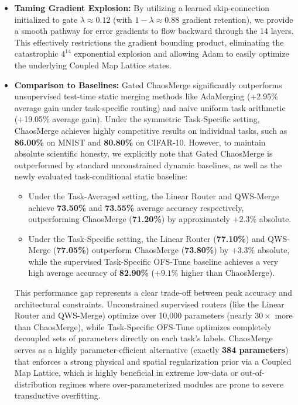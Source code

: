\begin{itemize}
    \item \textbf{Taming Gradient Explosion:} By utilizing a learned skip-connection initialized to gate $\lambda \approx 0.12$ (with $1-\lambda \approx 0.88$ gradient retention), we provide a smooth pathway for error gradients to flow backward through the 14 layers. This effectively restrictions the gradient bounding product, eliminating the catastrophic $4^{14}$ exponential explosion and allowing Adam to easily optimize the underlying Coupled Map Lattice states.
    \item \textbf{Comparison to Baselines:} Gated ChaosMerge significantly outperforms unsupervised test-time static merging methods like AdaMerging (+2.95\% average gain under task-specific routing) and naive uniform task arithmetic (+19.05\% average gain). Under the symmetric Task-Specific setting, ChaosMerge achieves highly competitive results on individual tasks, such as \textbf{86.00\%} on MNIST and \textbf{80.80\%} on CIFAR-10. 
    However, to maintain absolute scientific honesty, we explicitly note that Gated ChaosMerge is outperformed by standard unconstrained dynamic baselines, as well as the newly evaluated task-conditional static baseline:
    \begin{itemize}
        \item Under the Task-Averaged setting, the Linear Router and QWS-Merge achieve \textbf{73.50\%} and \textbf{73.55\%} average accuracy respectively, outperforming ChaosMerge (\textbf{71.20\%}) by approximately $+2.3\%$ absolute.
        \item Under the Task-Specific setting, the Linear Router (\textbf{77.10\%}) and QWS-Merge (\textbf{77.05\%}) outperform ChaosMerge (\textbf{73.80\%}) by $+3.3\%$ absolute, while the supervised Task-Specific OFS-Tune baseline achieves a very high average accuracy of \textbf{82.90\%} ($+9.1\%$ higher than ChaosMerge).
    \end{itemize}
    This performance gap represents a clear trade-off between peak accuracy and architectural constraints. Unconstrained supervised routers (like the Linear Router and QWS-Merge) optimize over 10,000 parameters (nearly $30\times$ more than ChaosMerge), while Task-Specific OFS-Tune optimizes completely decoupled sets of parameters directly on each task's labels. ChaosMerge serves as a highly parameter-efficient alternative (exactly \textbf{384 parameters}) that enforces a strong physical and spatial regularization prior via a Coupled Map Lattice, which is highly beneficial in extreme low-data or out-of-distribution regimes where over-parameterized modules are prone to severe transductive overfitting.
\end{itemize}

